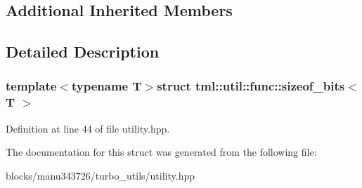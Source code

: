 \subsection*{Additional Inherited Members}


\subsection{Detailed Description}
\subsubsection*{template$<$typename T$>$struct tml\+::util\+::func\+::sizeof\+\_\+bits$<$ T $>$}



Definition at line 44 of file utility.\+hpp.



The documentation for this struct was generated from the following file\+:\begin{DoxyCompactItemize}
\item 
blocks/manu343726/turbo\+\_\+utils/utility.\+hpp\end{DoxyCompactItemize}
